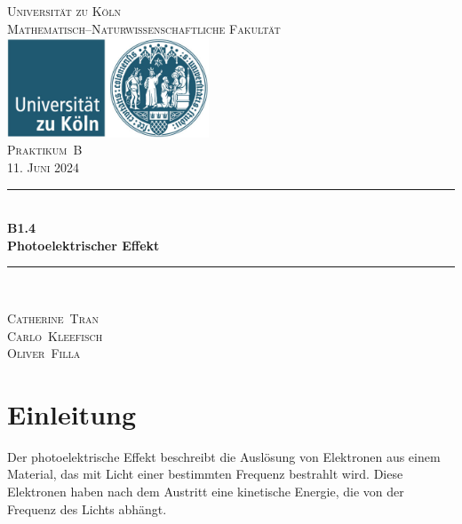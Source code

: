 \documentclass[12pt,a4paper]{scrartcl}
\numberwithin{equation}{section} %
\newcommand{\HRule}{\rule{\linewidth}{0.7mm}}
\begin{document}
\begin{titlepage}
	\pagestyle{empty}

	\begin{center}

	\textsc{\LARGE Universität zu Köln }\\ [0.4cm]
	\textsc{Mathematisch--Naturwissenschaftliche Fakultät} \\[1.5cm]

	\includegraphics[width=0.45\textwidth]{../media/uni.jpg} \\[1.5cm]  %

	\textsc{\Large Praktikum~B}\\[2mm]
	\textsc{11. Juni 2024}\\[10mm]
	\HRule \\[0.4cm]

		{	\Huge \bfseries B1.4}\\[0.4cm]
			{	\huge \bfseries Photoelektrischer Effekt}\\[0.3cm]
	
	\HRule \\[3cm]

 	\begin{center}
		\textsc{\Large Catherine~Tran } \\[3pt]
		\textsc{\Large Carlo~Kleefisch } \\[3pt]
		\textsc{\Large Oliver~Filla } \\[3pt]
	\end{center}
	\end{center}
\end{titlepage}

\newpage
\tableofcontents
\newpage

\clearpage
\hypertarget{einleitung}{%
\section{Einleitung}\label{einleitung}}

Der photoelektrische Effekt beschreibt die Auslösung von Elektronen aus einem Material, das mit Licht einer bestimmten Frequenz bestrahlt wird. Diese Elektronen haben nach dem Austritt eine kinetische Energie, die von der Frequenz des Lichts abhängt.
\end{document}
